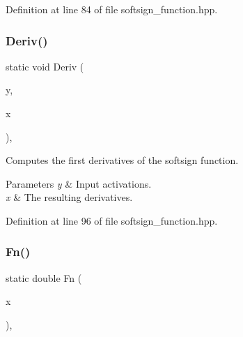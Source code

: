Definition at line 84 of file softsign\+\_\+function.\+hpp.

\mbox{\label{classmlpack_1_1ann_1_1SoftsignFunction_ad442502c34b67303b74c735641dab790}} 
\subsubsection{Deriv()\hspace{0.1cm}{\footnotesize\ttfamily [2/2]}}
{\footnotesize\ttfamily static void Deriv (\begin{DoxyParamCaption}\item[{const Input\+Vec\+Type \&}]{y,  }\item[{Output\+Vec\+Type \&}]{x }\end{DoxyParamCaption})\hspace{0.3cm}{\ttfamily [inline]}, {\ttfamily [static]}}



Computes the first derivatives of the softsign function. 


\begin{DoxyParams}{Parameters}
{\em y} & Input activations. \\
\hline
{\em x} & The resulting derivatives. \\
\hline
\end{DoxyParams}


Definition at line 96 of file softsign\+\_\+function.\+hpp.

\mbox{\label{classmlpack_1_1ann_1_1SoftsignFunction_a11bd9a1195e6b107f9fee73643bc328b}} 
\subsubsection{Fn()\hspace{0.1cm}{\footnotesize\ttfamily [1/2]}}
{\footnotesize\ttfamily static double Fn (\begin{DoxyParamCaption}\item[{const double}]{x }\end{DoxyParamCaption})\hspace{0.3cm}{\ttfamily [inline]}, {\ttfamily [static]}}



